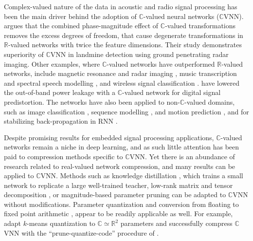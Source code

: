 \documentclass[a4paper,10pt,twocolumn]{article}
\newcommand{\real}{\mathbb{R}}
\newcommand{\cplx}{\mathbb{C}}
\begin{document}
Complex-valued nature of the data in acoustic and radio signal processing has been
the main driver behind the adoption of $\cplx$-valued neural networks ($\cplx$VNN).
\citet{hirose_complex-valued_2009} argues that the combined phase-magnitude effect of
$\cplx$-valued transformations removes the excess degrees of freedom, that cause
degenerate transformations in $\real$-valued networks with twice the feature dimensions.
Their study demonstrates superiority of $\cplx$VNN in landmine detection using ground
penetrating radar imaging. Other examples, where $\cplx$-valued networks have outperformed
$\real$-valued networks, include magnetic resonance \citep{hui_mri_1995,wang_deepcomplexmri_2020}
and radar imaging \citep{haensch_complex-valued_2010,zhang_complex-valued_2017}, music
transcription and spectral speech modelling \citep{wisdom_full-capacity_2016,trabelsi_deep_2018},
and wireless signal classification \citep{yang_complex_2019}. \citet{tarver_design_2019}
have lowered the out-of-band power leakage with a $\cplx$-valued network for digital
signal predistortion. The networks have also been applied to non-$\cplx$-valued domains,
such as image classification \citep{popa_complex-valued_2017}, sequence modelling
\citep{danihelka_associative_2016}, and motion prediction \citep{wolter_complex_2018},
and for stabilizing back-propagation in RNN \citep{wisdom_full-capacity_2016}.

Despite promising results for embedded signal processing applications, $\cplx$-valued
networks remain a niche in deep learning, and as such little attention has been paid
to compression methods specific to $\cplx$VNN.
%
Yet there is an abundance of research related to real-valued network compression, and
many results can be applied to $\cplx$VNN. Methods such as knowledge distillation
\citep{hinton_distilling_2015}, which trains a small network to replicate a large
well-trained teacher, low-rank matrix \citep{denton_exploiting_2014} and tensor decomposition
\citep{novikov_tensorizing_2015}, or magnitude-based parameter pruning \citep{zhu_prune_2018}
can be adapted to $\cplx$VNN without modifications. Parameter quantization and conversion
from floating to fixed point arithmetic \citep{courbariaux_training_2015,uhlich_mixed_2020},
appear to be readily applicable as well. For example, \citet{wu_compressing_2019} adapt
$k$-means quantization to $\cplx \simeq \real^2$ parameters and successfully compress
$\cplx$VNN with the ``prune-quantize-code'' procedure of \citet{han_deep_2016}.
\end{document}
